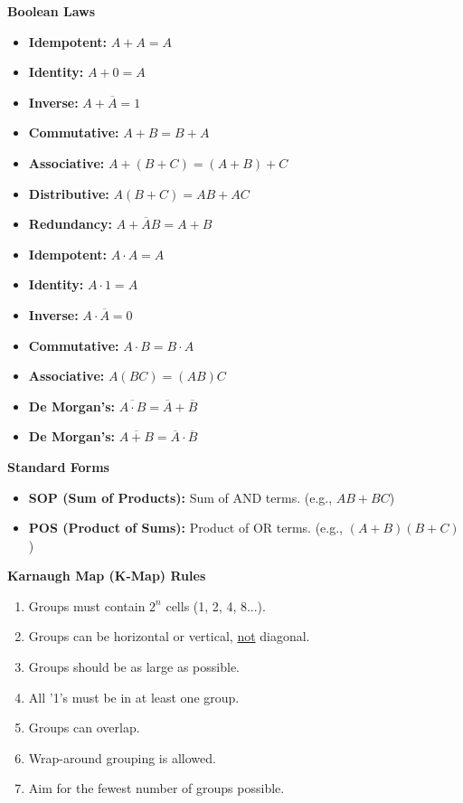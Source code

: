 \documentclass[a4paper, 8pt]{extarticle}
\newcommand{\subsectionheading}[1]{\normalsize\textbf{#1}}
\begin{document}
\begin{multicols}{3}
\subsectionheading{Boolean Laws}
\begin{multicols}{2}
\begin{itemize}
    \item \textbf{Idempotent:} $A+A=A$
    \item \textbf{Identity:} $A+0=A$
    \item \textbf{Inverse:} $A+\overline{A}=1$
    \item \textbf{Commutative:} $A+B=B+A$
    \item \textbf{Associative:} $A+(B+C)=(A+B)+C$
    \item \textbf{Distributive:} $A(B+C)=AB+AC$
    \item \textbf{Redundancy:} $A+\overline{A}B=A+B$
\end{itemize}
\columnbreak
\begin{itemize}
    \item \textbf{Idempotent:} $A \cdot A=A$
    \item \textbf{Identity:} $A \cdot 1=A$
    \item \textbf{Inverse:} $A \cdot \overline{A}=0$
    \item \textbf{Commutative:} $A \cdot B=B \cdot A$
    \item \textbf{Associative:} $A(BC)=(AB)C$
    \item \textbf{De Morgan's:} $\overline{A \cdot B}=\overline{A}+\overline{B}$
    \item \textbf{De Morgan's:} $\overline{A+B}=\overline{A} \cdot \overline{B}$
\end{itemize}
\end{multicols}

\subsectionheading{Standard Forms}
\begin{itemize}
    \item \textbf{SOP (Sum of Products):} Sum of AND terms. (e.g., $AB + BC$)
    \item \textbf{POS (Product of Sums):} Product of OR terms. (e.g., $(A+B)(B+C)$)
\end{itemize}

\subsectionheading{Karnaugh Map (K-Map) Rules}
\begin{enumerate}
    \item Groups must contain $2^n$ cells (1, 2, 4, 8...).
    \item Groups can be horizontal or vertical, \underline{not} diagonal.
    \item Groups should be as large as possible.
    \item All '1's must be in at least one group.
    \item Groups can overlap.
    \item Wrap-around grouping is allowed.
    \item Aim for the fewest number of groups possible.
\end{enumerate}
\columnbreak %


\end{multicols}
\end{document}
